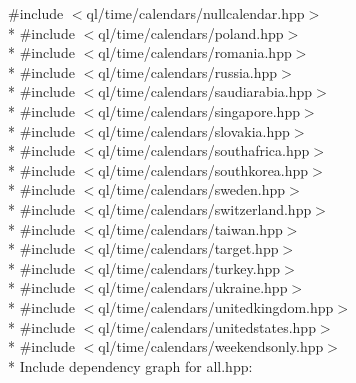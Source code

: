 {\ttfamily \#include $<$ql/time/calendars/nullcalendar.\+hpp$>$}\\*
{\ttfamily \#include $<$ql/time/calendars/poland.\+hpp$>$}\\*
{\ttfamily \#include $<$ql/time/calendars/romania.\+hpp$>$}\\*
{\ttfamily \#include $<$ql/time/calendars/russia.\+hpp$>$}\\*
{\ttfamily \#include $<$ql/time/calendars/saudiarabia.\+hpp$>$}\\*
{\ttfamily \#include $<$ql/time/calendars/singapore.\+hpp$>$}\\*
{\ttfamily \#include $<$ql/time/calendars/slovakia.\+hpp$>$}\\*
{\ttfamily \#include $<$ql/time/calendars/southafrica.\+hpp$>$}\\*
{\ttfamily \#include $<$ql/time/calendars/southkorea.\+hpp$>$}\\*
{\ttfamily \#include $<$ql/time/calendars/sweden.\+hpp$>$}\\*
{\ttfamily \#include $<$ql/time/calendars/switzerland.\+hpp$>$}\\*
{\ttfamily \#include $<$ql/time/calendars/taiwan.\+hpp$>$}\\*
{\ttfamily \#include $<$ql/time/calendars/target.\+hpp$>$}\\*
{\ttfamily \#include $<$ql/time/calendars/turkey.\+hpp$>$}\\*
{\ttfamily \#include $<$ql/time/calendars/ukraine.\+hpp$>$}\\*
{\ttfamily \#include $<$ql/time/calendars/unitedkingdom.\+hpp$>$}\\*
{\ttfamily \#include $<$ql/time/calendars/unitedstates.\+hpp$>$}\\*
{\ttfamily \#include $<$ql/time/calendars/weekendsonly.\+hpp$>$}\\*
Include dependency graph for all.\+hpp\+:
